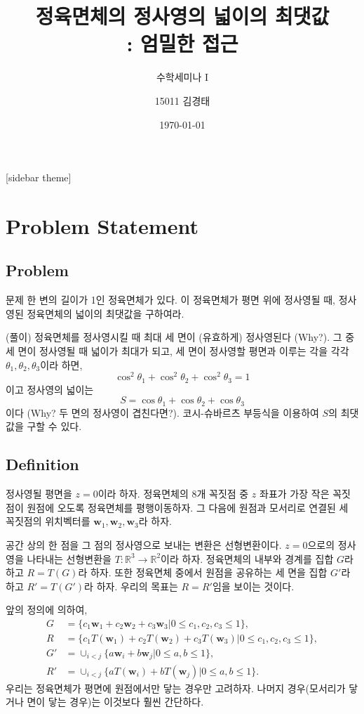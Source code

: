 \documentclass[11pt,t]{beamer}
\title[]{정육면체의 정사영의 넓이의 최댓값 \\: 엄밀한 접근}
\subtitle[]{수학세미나 I}
\author[]{15011 김경태}
\institute[GSHS]{경기과학고등학교}
\date[]{\today}
\begin{document}
\begin{frame}[plain]
\titlepage
\end{frame}
[sidebar theme]



\section{Problem Statement}

\subsection{Problem}
\begin{frame}
	\begin{block}{문제}
		한 변의 길이가 1인 정육면체가 있다. 이 정육면체가 평면 위에 정사영될 때, 정사영된 정육면체의 넓이의 최댓값을 구하여라.
	\end{block}
	(풀이) 정육면체를 정사영시킬 때 최대 세 면이 (유효하게) 정사영된다 (Why?). 그 중 세 면이 정사영될 때 넓이가 최대가 되고, 세 면이 정사영할 평면과 이루는 각을 각각 $\theta_1, \theta_2, \theta_3$이라 하면, 
	\[\cos^2\theta_1 + \cos^2\theta_2 +\cos^2\theta_3=1\]
	이고 정사영의 넓이는 
	\[S=\cos\theta_1+\cos\theta_2+\cos\theta_3\]
	이다 (Why? 두 면의 정사영이 겹친다면?). 코시-슈바르츠 부등식을 이용하여 $S$의 최댓값을 구할 수 있다.
\end{frame}

\subsection{Definition}
\begin{frame}
	정사영될 평면을 $z=0$이라 하자. 정육면체의 8개 꼭짓점 중 $z$ 좌표가 가장 작은 꼭짓점이 원점에 오도록 정육면체를 평행이동하자. 그 다음에 원점과 모서리로 연결된 세 꼭짓점의 위치벡터를 $\mathbf{w}_1, \mathbf{w}_2, \mathbf{w}_3$라 하자. 
	
	공간 상의 한 점을 그 점의 정사영으로 보내는 변환은 선형변환이다. $z=0$으로의 정사영을 나타내는 선형변환을 $T: \mathbb{R}^3 \to \mathbb{R}^2$이라 하자. 정육면체의 내부와 경계를 집합 $G$라 하고 $R=T(G)$라 하자. 또한 정육면체 중에서 원점을 공유하는 세 면을 집합 $G'$라 하고 $R'=T(G')$라 하자. 우리의 목표는 $R=R'$임을 보이는 것이다.
\end{frame}

\begin{frame}
	앞의 정의에 의하여,
	\begin{align*}
	G&=\{c_1 \mathbf{w}_1 + c_2 \mathbf{w}_2 + c_3 \mathbf{w}_3|0 \leq c_1, c_2, c_3 \leq 1\},\\
	R&=\{c_1 T(\mathbf{w}_1) + c_2 T(\mathbf{w}_2) + c_3 T(\mathbf{w}_3)|0 \leq c_1, c_2, c_3 \leq 1\},\\
	G'&=\cup_{i<j} \{a \mathbf{w}_i + b \mathbf{w}_j|0 \leq a,b \leq 1\},\\
	R'&=\cup_{i<j} \{a T(\mathbf{w}_i) + b T(\mathbf{w}_j)|0 \leq a,b \leq 1\}.
	\end{align*}
	우리는 정육면체가 평면에 원점에서만 닿는 경우만 고려하자. 나머지 경우(모서리가 닿거나 면이 닿는 경우)는 이것보다 훨씬 간단하다.
\end{frame}
\end{document}
